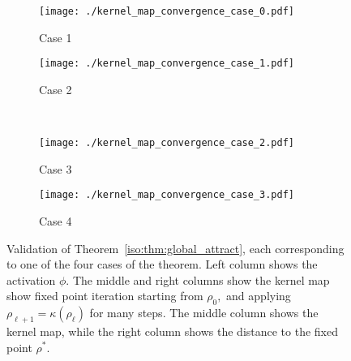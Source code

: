 \begin{figure}[ht]
    \centering
    \begin{subfigure}[b]{0.7\textwidth}
        \centering
        \texttt{[image: ./kernel\_map\_convergence\_case\_0.pdf]}
        \caption{\small Case 1}
    \end{subfigure}
    \hfill
    \begin{subfigure}[b]{0.7\textwidth}
        \centering
        \texttt{[image: ./kernel\_map\_convergence\_case\_1.pdf]}
        \caption{\small Case 2}
    \end{subfigure}
    \\
    \begin{subfigure}[b]{0.7\textwidth}
        \centering
        \texttt{[image: ./kernel\_map\_convergence\_case\_2.pdf]}
        \caption{\small Case 3}
    \end{subfigure}
    \hfill
    \begin{subfigure}[b]{0.7\textwidth}
        \centering
        \texttt{[image: ./kernel\_map\_convergence\_case\_3.pdf]}
        \caption{\small Case 4}
    \end{subfigure}
    \caption{\small Validation of Theorem~\ref{iso:thm:global_attract}, each corresponding to one of the four cases of the theorem. Left column shows the activation $\phi.$ The middle and right columns show the kernel map show fixed point iteration starting from $\rho_0,$ and applying $\rho_{\ell+1}=\kappa(\rho_\ell)$ for many steps. The middle column shows the kernel map, while the right column shows the distance to the fixed point $\rho^*$.}
    \label{iso:fig:validation_plots}
\end{figure}

